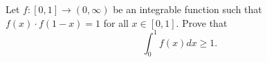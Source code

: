 \documentclass{article}
\begin{document}
\setlength{\parindent}{0pt}
Let $f: [0,1]\to (0,\infty)$ be an integrable function such that $f(x) \cdot f(1-x) = 1$ for all $x \in [0,1]$. Prove that \[\int_0^1 f(x) dx \geq 1.\]
\end{document}
